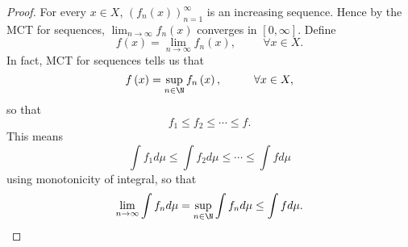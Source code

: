 \documentclass[pmath451]{subfiles}
\begin{document}
    \begin{proof}
        For every $x\in X$, $\left( f_{n}\left( x \right) \right)^{\infty}_{n=1}$ is an increasing sequence. Hence by the MCT for sequences, $\lim_{n\to\infty}f_n\left( x \right)$ converges in $\left[ 0,\infty \right]$. Define
        \begin{equation*}
            f\left( x \right) = \lim_{n\to\infty}f_n\left( x \right),\hspace{1cm}\forall x\in X.
        \end{equation*}
        In fact, MCT for sequences tells us that
        \begin{equation*}
            f\left( x \right) = \sup_{n\in\N}f_n\left( x \right),\hspace{1cm}\forall x\in X,
        \end{equation*}
        so that
        \begin{equation*}
            f_1\leq f_2\leq \cdots \leq f.
        \end{equation*}
        This means
        \begin{equation*}
            \int f_1d\mu \leq \int f_2d\mu \leq \cdots \leq \int fd\mu
        \end{equation*}
        using monotonicity of integral, so that
        \begin{equation*}
            \lim_{n\to\infty}\int f_nd\mu = \sup_{n\in\N} \int f_nd\mu \leq \int fd\mu.
        \end{equation*}


\end{proof}
\end{document}
